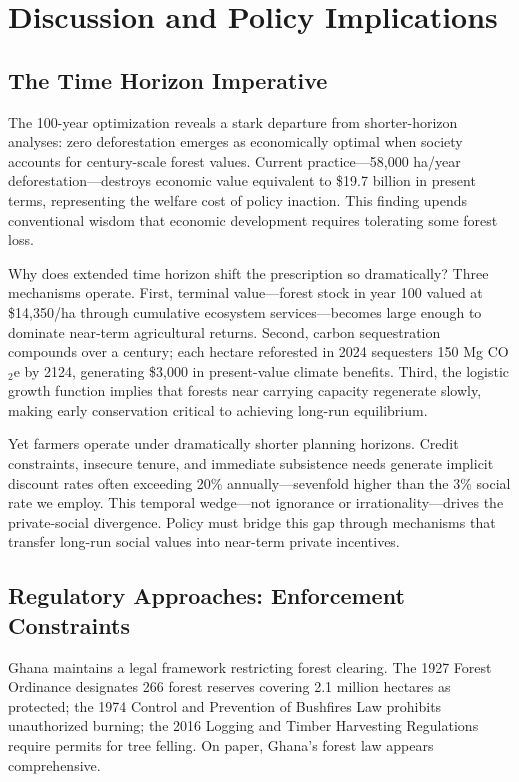 \section{Discussion and Policy Implications}

\subsection{The Time Horizon Imperative}

The 100-year optimization reveals a stark departure from shorter-horizon analyses: zero deforestation emerges as economically optimal when society accounts for century-scale forest values. Current practice—58,000 ha/year deforestation—destroys economic value equivalent to \$19.7 billion in present terms, representing the welfare cost of policy inaction. This finding upends conventional wisdom that economic development requires tolerating some forest loss.

Why does extended time horizon shift the prescription so dramatically? Three mechanisms operate. First, terminal value—forest stock in year 100 valued at \$14,350/ha through cumulative ecosystem services—becomes large enough to dominate near-term agricultural returns. Second, carbon sequestration compounds over a century; each hectare reforested in 2024 sequesters 150 Mg CO$_2$e by 2124, generating \$3,000 in present-value climate benefits. Third, the logistic growth function implies that forests near carrying capacity regenerate slowly, making early conservation critical to achieving long-run equilibrium.

Yet farmers operate under dramatically shorter planning horizons. Credit constraints, insecure tenure, and immediate subsistence needs generate implicit discount rates often exceeding 20\% annually—sevenfold higher than the 3\% social rate we employ. This temporal wedge—not ignorance or irrationality—drives the private-social divergence. Policy must bridge this gap through mechanisms that transfer long-run social values into near-term private incentives.

\subsection{Regulatory Approaches: Enforcement Constraints}

Ghana maintains a legal framework restricting forest clearing. The 1927 Forest Ordinance designates 266 forest reserves covering 2.1 million hectares as protected; the 1974 Control and Prevention of Bushfires Law prohibits unauthorized burning; the 2016 Logging and Timber Harvesting Regulations require permits for tree felling. On paper, Ghana's forest law appears comprehensive.

